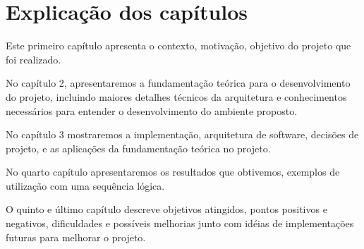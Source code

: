 	\section{Explicação dos capítulos}

		Este primeiro capítulo apresenta o contexto, motivação, objetivo do projeto que foi realizado. 

		No capítulo 2, apresentaremos a fundamentação teórica para o desenvolvimento do projeto, incluindo maiores detalhes técnicos da arquitetura e conhecimentos necessários para entender o desenvolvimento do ambiente proposto. 

		No capítulo 3 mostraremos a implementação, arquitetura de software, decisões de projeto, e as aplicações da fundamentação teórica no projeto. 

		No quarto capítulo apresentaremos os resultados que obtivemos, exemplos de utilização com uma sequência lógica. 

		O quinto e último capítulo descreve objetivos atingidos, pontos positivos e negativos, dificuldades e possíveis melhorias junto com idéias de implementações futuras para melhorar o projeto. 




